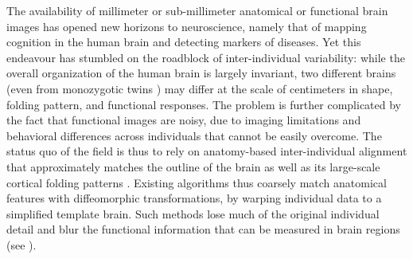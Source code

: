 The availability of millimeter or sub-millimeter anatomical or functional brain images has opened
new horizons to
neuroscience, namely that of mapping cognition in the human brain and detecting markers of diseases.
%
Yet this endeavour has stumbled on the roadblock of inter-individual
variability: while the overall organization of the human brain is largely invariant,
two different brains (even from monozygotic twins \citep{pizzigali2020})
may differ at the scale of centimeters in shape, folding pattern, and functional responses.
%
The problem is further complicated by the fact that functional images
are noisy, due to imaging limitations and behavioral
differences across individuals that cannot be easily overcome.
%
The status quo of the field is thus to rely on anatomy-based inter-individual alignment
that approximately matches the outline of the brain \citep{ants}
as well as its large-scale cortical folding patterns \citep{fs_reconall,fischl_freesurfer_2012}.
%
Existing algorithms thus coarsely match anatomical features with diffeomorphic transformations,
by warping individual data to a simplified template brain.
Such methods lose much of the original individual detail and blur the functional information
that can be measured in brain regions (see ).


